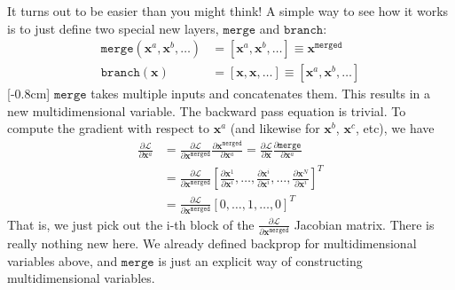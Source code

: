 \newpage
It turns out to be easier than you might think! A simple way to see how it works is to just define two special new layers, $\texttt{merge}$ and $\texttt{branch}$:
\begin{align}
    \texttt{merge}(\mathbf{x}^a, \mathbf{x}^b, \ldots) &= [\mathbf{x}^a, \mathbf{x}^b, \ldots] \equiv \mathbf{x}^{\texttt{merged}}\\
    \texttt{branch}(\mathbf{x}) &= [\mathbf{x}, \mathbf{x}, \ldots] \equiv [\mathbf{x}^a, \mathbf{x}^b, \ldots]
\end{align}
[-0.8cm]
$\texttt{merge}$ takes multiple inputs and concatenates them. This results in a new multidimensional variable. The backward pass equation is trivial. To compute the gradient with respect to $\mathbf{x}^{a}$ (and likewise for $\mathbf{x}^b$, $\mathbf{x}^c$, etc), we have
\begin{align}
    \frac{\partial \mathcal{L}}{\partial \mathbf{x}^{a}} &= \frac{\partial \mathcal{L}}{\partial \mathbf{x}^{\texttt{merged}}} \frac{\partial \mathbf{x}^{\texttt{merged}}}{\partial \mathbf{x}^{a}} = \frac{\partial \mathcal{L}}{\partial \mathbf{x}} \frac{\partial \texttt{merge}}{\partial \mathbf{x}^{a}}\\
    &= \frac{\partial \mathcal{L}}{\partial \mathbf{x}^{\texttt{merged}}} [\frac{\partial \mathbf{x}^{1}}{\partial \mathbf{x}^{i}}, \ldots, \frac{\partial \mathbf{x}^{i}}{\partial \mathbf{x}^{i}}, \ldots, \frac{\partial \mathbf{x}^{N}}{\partial \mathbf{x}^{i}}]^T\\
    &= \frac{\partial \mathcal{L}}{\partial \mathbf{x}^{\texttt{merged}}} [0, \ldots, 1, \ldots, 0]^T
\end{align}
That is, we just pick out the i-th block of the $\frac{\partial \mathcal{L}}{\partial \mathbf{x}^{\texttt{merged}}}$ Jacobian matrix. There is really nothing new here. We already defined backprop for multidimensional variables above, and $\texttt{merge}$ is just an explicit way of constructing multidimensional variables.


